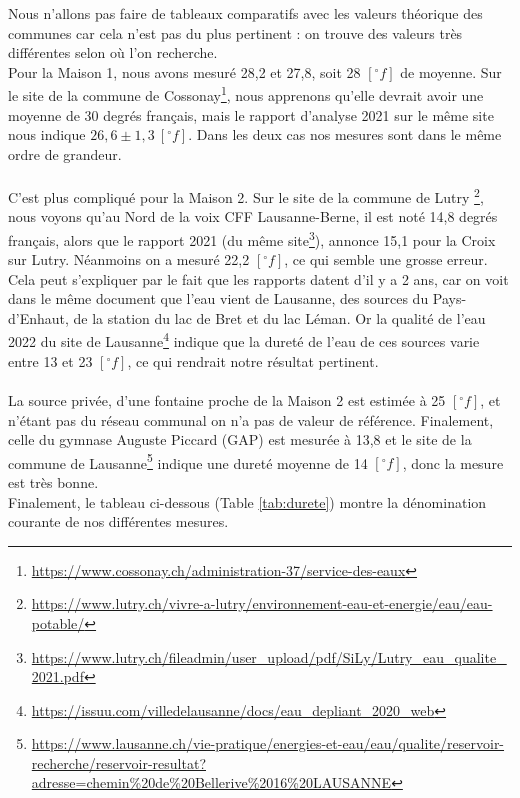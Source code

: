 \documentclass[11pt]{article}
\begin{document}
Nous n'allons pas faire de tableaux comparatifs avec les valeurs théorique des communes car cela n'est pas du plus pertinent : on trouve des valeurs très différentes selon où l'on recherche.\\
Pour la Maison 1, nous avons mesuré 28,2 et 27,8, soit 28 $[^\circ f]$ de moyenne. Sur le site de la commune de Cossonay\footnote{\href{https://www.cossonay.ch/administration-37/service-des-eaux}{https://www.cossonay.ch/administration-37/service-des-eaux}}, nous apprenons qu'elle devrait avoir une moyenne de 30 degrés français, mais le rapport d'analyse 2021 sur le même site nous indique $26,6 \pm 1,3 \ [^\circ f]$. Dans les deux cas nos mesures sont dans le même ordre de grandeur.\\ \\
C'est plus compliqué pour la Maison 2. Sur le site de la commune de Lutry \footnote{\href{https://www.lutry.ch/vivre-a-lutry/environnement-eau-et-energie/eau/eau-potable/}{https://www.lutry.ch/vivre-a-lutry/environnement-eau-et-energie/eau/eau-potable/}}, nous voyons qu'au Nord de la voix CFF Lausanne-Berne, il est noté 14,8 degrés français, alors que le rapport 2021 (du même site\footnote{\href{https://www.lutry.ch/fileadmin/user\_upload/pdf/SiLy/Lutry\_eau\_qualite\_2021.pdf}{https://www.lutry.ch/fileadmin/user\_upload/pdf/SiLy/Lutry\_eau\_qualite\_2021.pdf}}), annonce 15,1 pour la Croix sur Lutry. Néanmoins on a mesuré 22,2 $[^\circ f]$, ce qui semble une grosse erreur. Cela peut s'expliquer par le fait que les rapports datent d'il y a 2 ans, car on voit dans le même document que l'eau vient de Lausanne, des sources du Pays-d’Enhaut, de la station du lac de Bret et du lac Léman. Or la qualité de l'eau 2022 du site de Lausanne\footnote{\href{https://issuu.com/villedelausanne/docs/eau\_depliant\_2020\_web}{https://issuu.com/villedelausanne/docs/eau\_depliant\_2020\_web}} indique que la dureté de l'eau de ces sources varie entre 13 et 23 $[^\circ f]$, ce qui rendrait notre résultat pertinent.\\ \\
La source privée, d'une fontaine proche de la Maison 2 est estimée à 25 $[^\circ f]$, et n'étant pas du réseau communal on n'a pas de valeur de référence. Finalement, celle du gymnase Auguste Piccard (GAP) est mesurée à 13,8 et le site de la commune de Lausanne\footnote{\href{https://www.lausanne.ch/vie-pratique/energies-et-eau/eau/qualite/reservoir-recherche/reservoir-resultat?adresse=chemin\%20de\%20Bellerive\%2016\%20LAUSANNE}{https://www.lausanne.ch/vie-pratique/energies-et-eau/eau/qualite/reservoir-recherche/reservoir-resultat?adresse=chemin\%20de\%20Bellerive\%2016\%20LAUSANNE}} indique une dureté moyenne de 14 $[^\circ f]$, donc la mesure est très bonne. \\
Finalement, le tableau ci-dessous (Table \ref{tab:durete}) montre la dénomination courante de nos différentes mesures.
\end{document}
